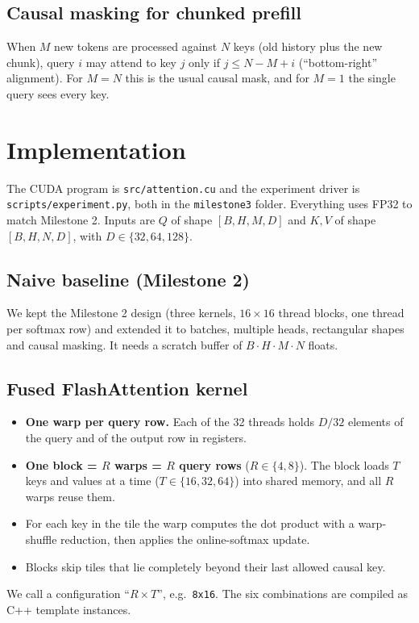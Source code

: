 \documentclass[11pt]{article}
\begin{document}
\subsection{Causal masking for chunked prefill}
When $M$ new tokens are processed against $N$ keys (old history plus the new
chunk), query $i$ may attend to key $j$ only if $j \le N - M + i$
(``bottom-right'' alignment). For $M = N$ this is the usual causal mask, and
for $M = 1$ the single query sees every key.

\section{Implementation}

The CUDA program is \texttt{src/attention.cu} and the experiment driver is
\texttt{scripts/experiment.py}, both in the \texttt{milestone3} folder.
Everything uses FP32 to match Milestone 2. Inputs are $Q$ of shape $[B, H, M, D]$ and $K, V$ of
shape $[B, H, N, D]$, with $D \in \{32, 64, 128\}$.

\subsection{Naive baseline (Milestone 2)}
We kept the Milestone 2 design (three kernels, $16 \times 16$ thread blocks,
one thread per softmax row) and extended it to batches, multiple heads,
rectangular shapes and causal masking. It needs a scratch buffer of
$B \cdot H \cdot M \cdot N$ floats.

\subsection{Fused FlashAttention kernel}
\begin{itemize}
  \item \textbf{One warp per query row.} Each of the 32 threads holds
        $D/32$ elements of the query and of the output row in registers.
  \item \textbf{One block = $R$ warps = $R$ query rows} ($R \in \{4, 8\}$).
        The block loads $T$ keys and values at a time
        ($T \in \{16, 32, 64\}$) into shared memory, and all $R$ warps reuse them.
  \item For each key in the tile the warp computes the dot product with a
        warp-shuffle reduction, then applies the online-softmax update.
  \item Blocks skip tiles that lie completely beyond their last allowed causal key.
\end{itemize}
We call a configuration ``$R{\times}T$'', e.g.\ \texttt{8x16}. The six
combinations are compiled as C++ template instances.
\end{document}
